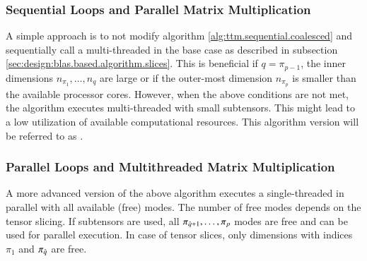 \subsubsection{Sequential Loops and Parallel Matrix Multiplication}
A simple approach is to not modify algorithm \ref{alg:ttm.sequential.coalesced} and sequentially call a multi-threaded  in the base case as described in subsection \ref{sec:design:blas.based.algorithm.slices}.
This is beneficial if $q = \pi_{p-1}$, the inner dimensions $n_{\pi_1},\dots,n_{q}$ are large or if the outer-most dimension $n_{\pi_{p}}$ is smaller than the available processor cores.
However, when the above conditions are not met, the algorithm executes multi-threaded  with small subtensors.
This might lead to a low utilization of available computational resources.
This algorithm version will be referred to as .

\subsubsection{Parallel Loops and Multithreaded Matrix Multiplication}
A more advanced version of the above algorithm executes a single-threaded  in parallel with all available (free) modes.
The number of free modes depends on the tensor slicing.
If subtensors are used, all $\pi_{\hat{q}+1}, \dots, \pi_{p}$ modes are free and can be used for parallel execution.
In case of tensor slices, only dimensions with indices $\pi_1$ and $\pi_{\hat{q}}$ are free.



